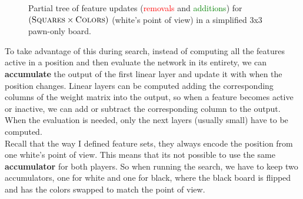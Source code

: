 \begin{figure}[H]
\caption{Partial tree of feature updates (\textcolor{Red}{removals} and \textcolor{Green}{additions}) for $(\textsc{Squares} \times \textsc{Colors})$ (white's point of view) in a simplified 3x3 pawn-only board.}
\label{fig:updates_tree}
\end{figure}

To take advantage of this during search, instead of computing all the features active in a position and then evaluate the network in its entirety, we can \textbf{accumulate} the output of the first linear layer and update it with when the position changes. Linear layers can be computed adding the corresponding columns of the weight matrix into the output, so when a feature becomes active or inactive, we can add or subtract the corresponding column to the output. When the evaluation is needed, only the next layers (usually small) have to be computed. \\

Recall that the way I defined feature sets, they always encode the position from one white's point of view. This means that its not possible to use the same \textbf{accumulator} for both players. So when running the search, we have to keep two accumulators, one for white and one for black, where the black board is flipped and has the colors swapped to match the point of view.


%
%
%
%
%
%
%
%
%
%
%
%
%
%
%
%
%
%
%
%
%



